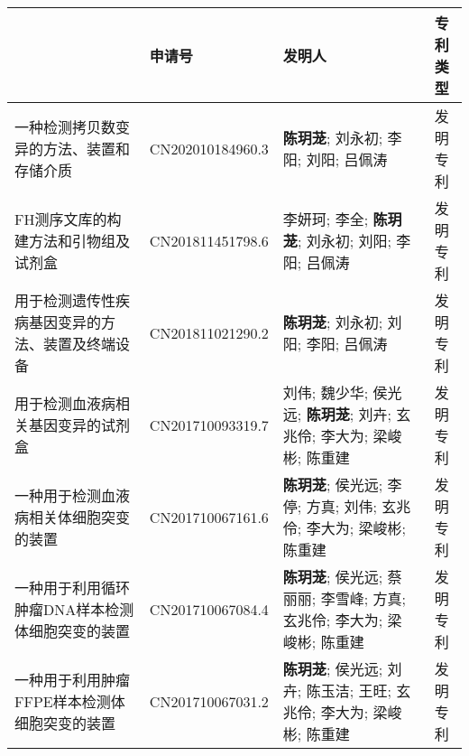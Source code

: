 



\begin{table}[h]

\centering
\tiny
\begin{tabularx}{\textwidth}{>{\raggedright\arraybackslash}X| X| X| c}
\toprule
{\textbf{专利名称}} & {\textbf{申请号}} & {\textbf{发明人}} & {\textbf{专利类型}} \\
\midrule

一种检测拷贝数变异的方法、装置和存储介质 & CN202010184960.3 & \textbf{陈玥茏}; 刘永初; 李阳; 刘阳; 吕佩涛 & 发明专利 \\
\addlinespace

FH测序文库的构建方法和引物组及试剂盒 & CN201811451798.6 & 李妍珂; 李全; \textbf{陈玥茏}; 刘永初; 刘阳; 李阳; 吕佩涛 &发明专利 \\
\addlinespace

用于检测遗传性疾病基因变异的方法、装置及终端设备 & CN201811021290.2 & \textbf{陈玥茏}; 刘永初; 刘阳; 李阳; 吕佩涛 & 发明专利\\
\addlinespace

用于检测血液病相关基因变异的试剂盒 & CN201710093319.7 & 刘伟; 魏少华; 侯光远; \textbf{陈玥茏}; 刘卉; 玄兆伶; 李大为; 梁峻彬; 陈重建 & 发明专利\\
\addlinespace

一种用于检测血液病相关体细胞突变的装置 & CN201710067161.6 & \textbf{陈玥茏}; 侯光远; 李停; 方真; 刘伟; 玄兆伶; 李大为; 梁峻彬; 陈重建 & 发明专利\\
\addlinespace

一种用于利用循环肿瘤DNA样本检测体细胞突变的装置 & CN201710067084.4 & \textbf{陈玥茏}; 侯光远; 蔡丽丽; 李雪峰; 方真; 玄兆伶; 李大为; 梁峻彬; 陈重建 &发明专利 \\
\addlinespace

一种用于利用肿瘤FFPE样本检测体细胞突变的装置 & CN201710067031.2 & \textbf{陈玥茏}; 侯光远; 刘卉; 陈玉洁; 王旺; 玄兆伶; 李大为; 梁峻彬; 陈重建 &发明专利 \\
\bottomrule
\end{tabularx}
\end{table}

